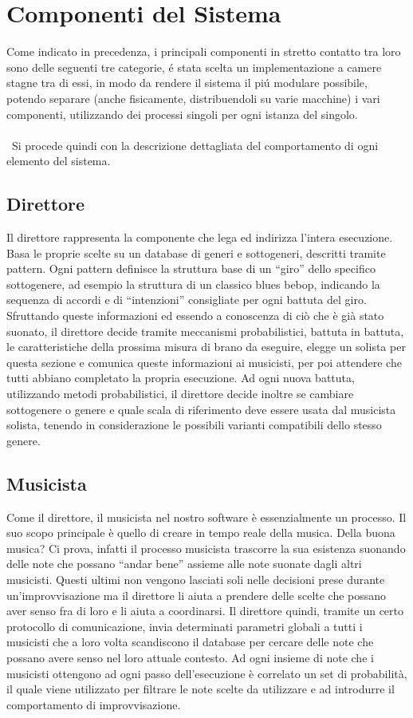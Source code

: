 \section{Componenti del Sistema}
Come indicato in precedenza, i principali componenti in stretto contatto
tra loro sono delle seguenti tre categorie, \'e stata scelta un implementazione
a camere stagne tra di essi, in modo da rendere il sistema il pi\'u modulare
possibile, potendo separare (anche fisicamente, distribuendoli su varie macchine)
i vari componenti, utilizzando dei processi singoli per ogni istanza del singolo.\\\
\\\
Si procede quindi con la descrizione dettagliata del comportamento di ogni
elemento del sistema.

\subsection{Direttore}
Il direttore rappresenta la componente che lega ed indirizza l'intera esecuzione. Basa le proprie scelte su un database di generi e sottogeneri, descritti tramite pattern. 
Ogni pattern definisce la struttura base di un ``giro'' dello specifico sottogenere, ad esempio la struttura di un classico blues bebop, indicando la sequenza di accordi e di ``intenzioni'' consigliate per ogni battuta del giro. 
Sfruttando queste informazioni ed essendo a conoscenza di ciò che è già stato suonato, il direttore decide tramite meccanismi probabilistici, battuta in battuta, le caratteristiche della prossima misura di brano da eseguire, elegge un solista per questa sezione e comunica queste informazioni ai musicisti, per poi attendere che tutti abbiano completato la propria esecuzione.
Ad ogni nuova battuta, utilizzando metodi probabilistici, il direttore decide inoltre se cambiare sottogenere o genere e quale scala di riferimento deve essere usata dal musicista solista, tenendo in considerazione le possibili varianti compatibili dello stesso genere.

\subsection{Musicista}
Come il direttore, il musicista nel nostro software è essenzialmente un processo. 
Il suo scopo principale è quello di creare in tempo reale della musica. 
Della buona musica? Ci prova, infatti il processo musicista trascorre la
sua esistenza suonando delle note che possano ``andar bene'' assieme alle note
 suonate dagli altri musicisti. Questi ultimi non vengono lasciati soli nelle 
decisioni prese durante un'improvvisazione ma il direttore li aiuta a prendere 
delle scelte che possano aver senso fra di loro e li aiuta a coordinarsi. 
Il direttore quindi, tramite un certo protocollo di comunicazione, 
invia determinati parametri globali a tutti i musicisti che a loro volta 
scandiscono il database per cercare delle note che possano avere senso nel loro 
attuale contesto. 
Ad ogni insieme di note che i musicisti ottengono ad ogni passo dell'esecuzione
 è correlato un set di probabilità, il quale viene utilizzato per filtrare le 
note scelte da utilizzare e ad introdurre il comportamento di improvvisazione.

